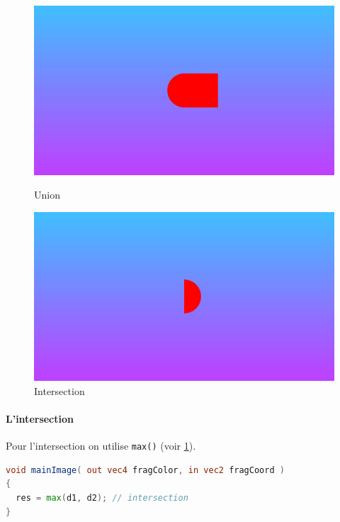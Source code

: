 \begin{figure}[h]
  \begin{minipage}[b]{0.45\linewidth}
    \centering
    \includegraphics[width=\linewidth]{images/sdf/sdf_op_00.JPG}
    \caption{Union}
    \label{sdf_op_00}
  \end{minipage}
  \hspace{0.1\linewidth} %
  \begin{minipage}[b]{0.45\linewidth}
    \centering
    \includegraphics[width=\linewidth]{images/sdf/sdf_op_01.JPG}
    \caption{Intersection}
    \label{sdf_op_01}
  \end{minipage}
\end{figure}

\paragraph*{L'intersection}

Pour l'intersection on utilise \lstinline{max()} (voir \ref{sdf_op_01}).

\begin{minipage}{\linewidth}
\begin{lstlisting}[language=GLSL,caption=Intersection,captionpos=b,frame=single]
void mainImage( out vec4 fragColor, in vec2 fragCoord )
{
  res = max(d1, d2); // intersection
}
\end{lstlisting}
\end{minipage}

